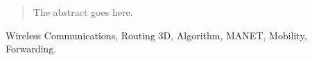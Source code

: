 \documentclass[journal,comsoc]{IEEEtran}
\begin{document}







\maketitle

\begin{abstract}
The abstract goes here.
\end{abstract}

\begin{IEEEkeywords}
Wireless Communications, Routing 3D, Algorithm, MANET, Mobility, Forwarding.
\end{IEEEkeywords}

\IEEEpeerreviewmaketitle
\end{document}
